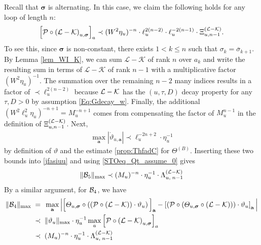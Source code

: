 Recall that $\boldsymbol{\sigma}$ is alternating. In this case, we claim the following holds for any loop of length $n$:
\begin{align}\label{jywiiwsoks}
    \left[{\cal P} \circ
    \left(\mathcal{L} - \mathcal{K}\right)_{u, \boldsymbol{\sigma}}\right]_a \prec (W^2\eta_u)^{-n}\cdot  \ell_u^{2(n-2)} \cdot \ell_{u}^{-2(n-1)} \cdot \Xi^{(\mathcal{L}-\mathcal{K})}_{u, n-1}.
\end{align}
To see this, since $\boldsymbol{\sigma}$ is non-constant, there exists $1 < k \leq n$ such that $\sigma_k = \overline{\sigma}_{k+1}$. By Lemma \ref{lem_WI_K}, we can sum $\mathcal{L} - \mathcal{K}$ of rank $n$ over $a_k$ and write the resulting sum in terms of $\mathcal{L} - \mathcal{K}$ of rank $n-1$ with a multiplicative factor $(W^{2} \eta_u)^{-1}$. The summation over the remaining $n-2$ many indices results in a factor of $\prec\ell_{u}^{2(n-2)}$ because ${\cal L}-{\cal K}$ has the $(u,\tau,D)$ decay property for any $\tau,D>0$ by assumption \eqref{Eq:Gdecay_w}. Finally, the additional $(W^{2}\ell_{u}^{2}\eta_{u})^{-n+1}=M_{u}^{-n+1}$ comes from compensating the factor of $M_{u}^{n-1}$ in the definition of $\Xi^{({\cal L}-{\cal K})}_{u,n-1}$. Next, 
    \begin{align}
   \max_{\textbf{a}}\left| 
       \dot \vartheta_{u,\textbf{a} } \right|\prec \ell_u^{-2n+2}\cdot \eta_u^{-1}  \label{eq:thetadot_bound}
   \end{align}
by definition of $\vartheta$ and the estimate \eqref{prop:ThfadC} for $\Theta^{(B)}$. Inserting these two bounds into \eqref{jfasiuu} and using \eqref{STOeq_Qt_assume_0} gives
\begin{align}\label{kkuuwsaf}
  \|{\cal B}_5\|_{\max}  \prec (M_u)^{-n}\cdot \eta_u^{-1}\cdot   \Lambda^{(\cal L-K)}_{u,\; n-1}
 \end{align}
By a similar argument, for ${\cal B}_4$, we have
 \begin{align}\label{kkuuwsaf5}
  \|{\cal B}_4\|_{\max}
   \;=\; & \; \max_{\textbf{a}}\Big|\Big[\varTheta_{u, \boldsymbol{\sigma}} \circ \left(\left( {\cal P} \circ \left( \mathcal{L} - \mathcal{K} \right)\right) \cdot \vartheta_u \right)\Big]_{\textbf{a}} 
    - \left[ \left({\cal P} \circ \left(\varTheta_{u, \boldsymbol{\sigma}} \circ (\mathcal{L} - \mathcal{K})\right)\right) \cdot \vartheta_u \right]_{\textbf{a}}\Big|
\\\nonumber
 \;\prec \; & \;  \|\vartheta_u\|_{\max}\cdot \eta_u^{-1}\max_a\left[ {\cal P} \circ \left(  \mathcal{L} - \mathcal{K} \right)_{u,\boldsymbol{\sigma}} \right]_{a} 
  \\\nonumber
 \;\prec \; & \;(M_u)^{-n}\cdot \eta_u^{-1}\cdot   \Lambda^{(\cal L-K)}_{u,\; n-1}
\end{align} 

